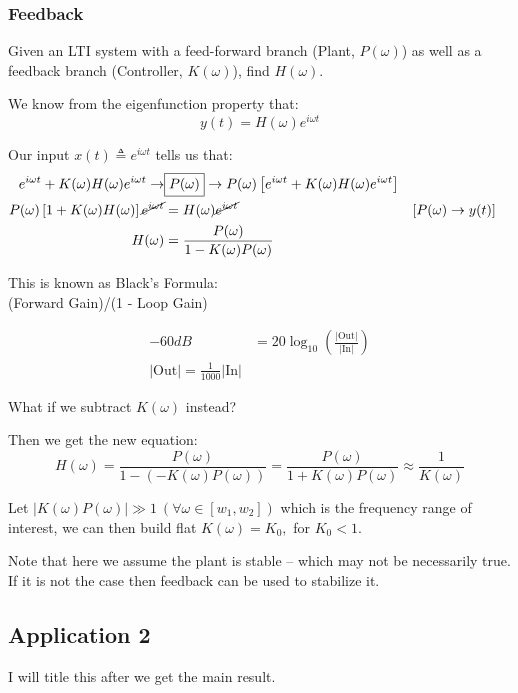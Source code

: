 \subsubsection{Feedback}
Given an LTI system with a feed-forward branch (Plant, $P(\omega)$) as well as a feedback branch (Controller, $K(\omega)$), find $H(\omega)$.

We know from the eigenfunction property that:
\[
    y(t)= H(\omega)e^{i\omega t}
\]

Our input $x(t)\triangleq e^{i\omega t}$ tells us that:
\begin{align*}
    e^{i\omega t} + K(\omega)H(\omega)e^{i\omega t}
    \to 
    &\boxed{P(\omega)}
    \to P(\omega)\left[e^{i\omega t}
    +
    K(\omega)H(\omega)e^{i\omega t}\right]
    \\
    P(\omega)\left[1+ K(\omega)H(\omega)\right]\cancel{e^{i\omega t}}
    &=
    H(\omega)\cancel{e^{i\omega t}}
    &&\text{[$P(\omega) \to y(t)$]}
    \\
    H(\omega)
    &=
    \frac{P(\omega)}{1-K(\omega)P(\omega)}
\end{align*}

This is known as Black's Formula: \\
(Forward Gain)/(1 - Loop Gain)

\hrulefill

\begin{align*}
    -60 dB 
    &= 20\log_10(\frac{|\text{Out}|}{|\text{In}|})
    \\
    |\text{Out}|=\frac1{1000}|\text{In}|
\end{align*}

\hrulefill

What if we subtract $K(\omega)$ instead?


Then we get the new equation:
\[
    H(\omega)
    =
    \frac{P(\omega)}{1-(-K(\omega)P(\omega))}
    =
    \frac{P(\omega)}{1+K(\omega)P(\omega)}
    \approx
    \frac1{K(\omega)}
\]

Let $|K(\omega)P(\omega)|\gg1 
\ (\forall\omega\in[w_1, w_2])$ which is the frequency range of interest, we can then build flat $K(\omega)=K_0,$
 for $K_0<1$.
 
Note that here we assume the plant is stable -- which may not be necessarily true. If it is not the case then feedback can be used to stabilize it.

\subsection{Application 2}
I will title this after we get the main result.

